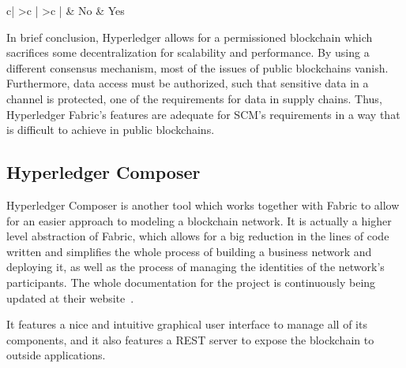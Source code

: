 \begin{table}[]
\begin{tabular}{c|
>{}c |
>{}c |}
              & {\color[HTML]{000000} No}                                                                                                                                                  & {\color[HTML]{000000} Yes}                                                                                                                                                                    \\ \hline
\end{tabular}
\caption{Comparison between traditional PoW consensus and Hyperledger's BFT consensus mechanism}
\label{table:consensus_comparison}
\end{table}





In brief conclusion, Hyperledger allows for a permissioned blockchain which sacrifices some decentralization for scalability and performance. By using a different consensus mechanism, most of the issues of public blockchains vanish. Furthermore, data access must be authorized, such that sensitive data in a channel is protected, one of the requirements for data in supply chains. Thus, Hyperledger Fabric's features are adequate for SCM's requirements in a way that is difficult to achieve in public blockchains.

\subsection{Hyperledger Composer}
\label{sec:composer-background}
Hyperledger Composer is another tool which works together with Fabric to allow for an easier approach to modeling a blockchain network. It is actually a higher level abstraction of Fabric, which allows for a big reduction in the lines of code written and simplifies the whole process of building a business network and deploying it, as well as the process of managing the identities of the network's participants. The whole documentation for the project is continuously being updated at their website~\cite{LinuxFoundation2018}.

It features a nice and intuitive graphical user interface to manage all of its components, and it also features a REST server to expose the blockchain to outside applications.

